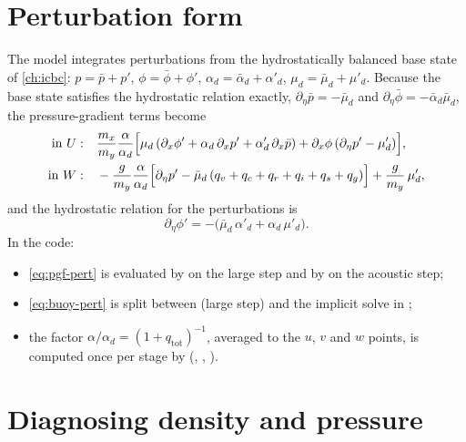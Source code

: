\section{Perturbation form}

The model integrates perturbations from the hydrostatically balanced base state of \cref{ch:icbc}:
$p = \bar p + p'$, $\phi = \bar\phi + \phi'$, $\alpha_d = \bar\alpha_d + \alpha'_d$,
$\mu_d = \bar\mu_d + \mu'_d$. Because the base state satisfies the hydrostatic relation exactly,
$\partial_\eta\bar p = -\bar\mu_d$ and $\partial_\eta\bar\phi = -\bar\alpha_d\bar\mu_d$, the pressure-gradient
terms become
\begin{align}
  \text{in } U:&\quad \frac{m_x}{m_y}\frac{\alpha}{\alpha_d}\Bigl[\mu_d\,(\partial_x\phi' + \alpha_d\,\partial_x p'
     + \alpha'_d\,\partial_x\bar p) + \partial_x\phi\,(\partial_\eta p' - \mu'_d)\Bigr], \label{eq:pgf-pert}\\
  \text{in } W:&\quad -\frac{g}{m_y}\frac{\alpha}{\alpha_d}\Bigl[\partial_\eta p'
     - \bar\mu_d\,(q_v + q_c + q_r + q_i + q_s + q_g)\Bigr] + \frac{g}{m_y}\,\mu'_d , \label{eq:buoy-pert}
\end{align}
and the hydrostatic relation for the perturbations is
\begin{equation}
  \partial_\eta\phi' = -\bigl(\bar\mu_d\,\alpha'_d + \alpha_d\,\mu'_d\bigr).
  \label{eq:hydro-pert}
\end{equation}
In the code:
\begin{itemize}
  \item \cref{eq:pgf-pert} is evaluated by 
    on the large step and by  on the acoustic step;
  \item \cref{eq:buoy-pert} is split between  (large step)
    and the implicit solve in ;
  \item the factor $\alpha/\alpha_d = (1 + q_{\mathrm{tot}})^{-1}$, averaged to the $u$, $v$ and $w$ points, is
    computed once per stage by  (, ,
    ).
\end{itemize}

\section{Diagnosing density and pressure}

